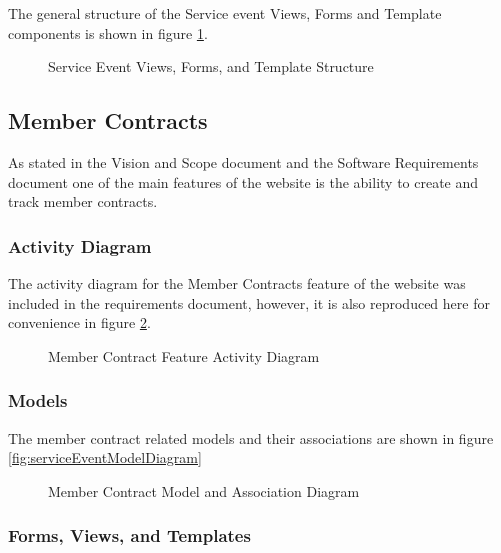 \documentclass{article}
\begin{document}
The general structure of the Service event Views, Forms and Template components is shown in figure \ref{fig:serviceEventViewFormTemplateDiagram}.

\FloatBarrier
\begin{figure}[h!]
\centering
{}
\caption{Service Event Views, Forms, and Template Structure}
\label{fig:serviceEventViewFormTemplateDiagram}
\end{figure}
\FloatBarrier

\subsection{Member Contracts}

As stated in the Vision and Scope document and the Software Requirements document one of the main features of the website is the ability to create and track member contracts.

\subsubsection{Activity Diagram}
The activity diagram for the Member Contracts feature of the website was included in the requirements document, however, it is also reproduced here for convenience in figure \ref{fig:memberContractActivityDiagram}.

\FloatBarrier
\begin{figure}[h!]
\centering
{}
\caption{Member Contract Feature Activity Diagram}
\label{fig:memberContractActivityDiagram}
\end{figure}
\FloatBarrier

\subsubsection{Models}

The member contract related models and their associations are shown in figure \ref{fig:serviceEventModelDiagram}

\FloatBarrier
\begin{figure}[h!]
\centering
{}
\caption{Member Contract Model and Association Diagram}
\label{fig:memberContractModelDiagram}
\end{figure}
\FloatBarrier

\subsubsection{Forms, Views, and Templates}
\end{document}
